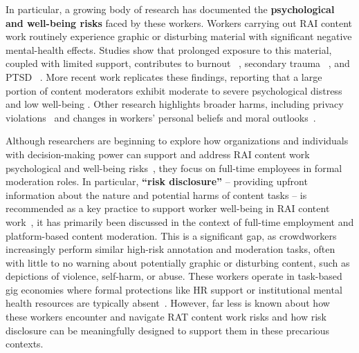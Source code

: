 In particular, a growing body of research has documented the \textbf{psychological and well-being risks} faced by these workers. Workers carrying out RAI content work routinely experience graphic or disturbing material with significant negative mental-health effects. Studies show that prolonged exposure to this material, coupled with limited support, contributes to burnout ~\cite{dosono2019moderation}, secondary trauma ~\cite{martinez2024secondary}, and PTSD ~\cite{steiger_psychological_2021, alemadi2024emotional, Michel2018ExContentMS, ruckenstein_re-humanizing_2020, Dwoskin_2019, arsht_2018_human}. More recent work replicates these findings, reporting that a large portion of content moderators exhibit moderate to severe psychological distress and low well-being \cite{Spence2025ContentModeratorMentalHealth}. Other research highlights broader harms, including privacy violations~\cite{pinchevski2023social, schopke-gonzalez_why_2022} and changes in workers’ personal beliefs and moral outlooks~\cite{newton_trauma_2019, Stackpole_2022, Douek_2021}.

Although researchers are beginning to explore how organizations and individuals with decision-making power can support and address RAI content work psychological and well-being risks~\cite{qian2025aura, qian2025locating, steiger_psychological_2021, bharucha2023content}, they focus on full-time employees in formal moderation roles.
In particular, \textbf{``risk disclosure''} -- providing upfront information about the nature and potential harms of content tasks -- is recommended as a key practice to support worker well-being in RAI content work~\cite{bharucha2023content, qian2025aura}, it has primarily been discussed in the context of full-time employment and platform-based content moderation. This is a significant gap, as crowdworkers increasingly perform similar high-risk annotation and moderation tasks, often with little to no warning about potentially graphic or disturbing content, such as depictions of violence, self-harm, or abuse. These workers operate in task-based gig economies where formal protections like HR support or institutional mental health resources are typically absent~\cite{irani2013turkopticon, martin2014being, salehi2018ink, silberman2018responsible, toxtli2021quantifying, schlicher2021flexible}. However, far less is known about how these workers encounter and navigate RAT content work risks and how risk disclosure can be meaningfully designed to support them in these precarious contexts. %


